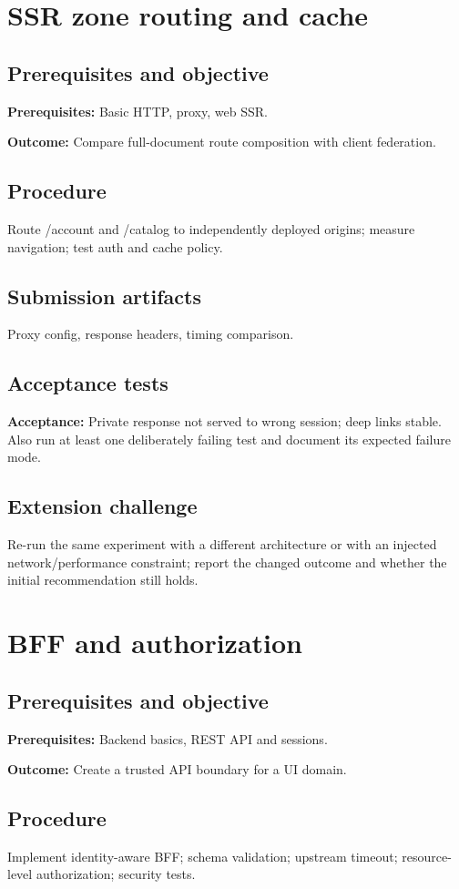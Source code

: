 \documentclass[11pt,letterpaper,oneside]{report}
\newcommand{\criterion}[1]{\textbf{Acceptance:} #1}
\begin{document}
\chapter{SSR zone routing and cache}
\section{Prerequisites and objective}
\textbf{Prerequisites:} Basic HTTP, proxy, web SSR.\par
\textbf{Outcome:} Compare full-document route composition with client federation.
\section{Procedure}
Route /account and /catalog to independently deployed origins; measure navigation; test auth and cache policy.
\section{Submission artifacts}
Proxy config, response headers, timing comparison.
\section{Acceptance tests}
\criterion{Private response not served to wrong session; deep links stable.} Also run at least one deliberately failing test and document its expected failure mode.
\section{Extension challenge}
Re-run the same experiment with a different architecture or with an injected network/performance constraint; report the changed outcome and whether the initial recommendation still holds.

\chapter{BFF and authorization}
\section{Prerequisites and objective}
\textbf{Prerequisites:} Backend basics, REST API and sessions.\par
\textbf{Outcome:} Create a trusted API boundary for a UI domain.
\section{Procedure}
Implement identity-aware BFF; schema validation; upstream timeout; resource-level authorization; security tests.
\end{document}
